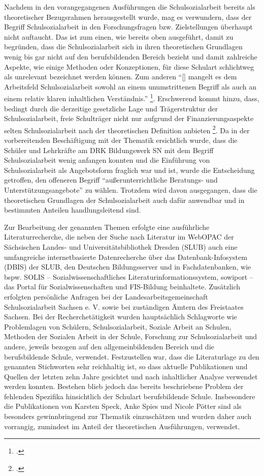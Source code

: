 Nachdem in den vorangegangenen Ausführungen die Schulsozialarbeit bereits als theoretischer Bezugsrahmen herausgestellt wurde, mag es verwundern, dass der Begriff Schulsozialarbeit in den Forschungsfragen bzw. Zielstellungen überhaupt nicht auftaucht. Das ist zum einen, wie bereits oben ausgeführt, damit zu begründen, dass die Schulsozialarbeit sich in ihren theoretischen Grundlagen wenig bis gar nicht auf den berufsbildenden Bereich bezieht und damit zahlreiche Aspekte, wie einige Methoden oder Konzeptionen, für diese Schulart schlichtweg als unrelevant bezeichnet werden können. Zum anderen "`[\punkte] mangelt es dem Arbeitsfeld Schulsozialarbeit sowohl an einem unumstrittenen Begriff als auch an einem relativ klaren inhaltlichen Verständnis."' \footcite[23]{Speck2007}. Erschwerend kommt hinzu, dass, bedingt durch die derzeitige gesetzliche Lage und Trägerstruktur der Schulsozialarbeit, freie Schulträger nicht nur aufgrund der Finanzierungsaspekte selten Schulsozialarbeit nach der theoretischen Definition anbieten \footcite[vgl.][116]{Stuewe2015}. Da in der vorbereitenden Beschäftigung mit der Thematik ersichtlich wurde, dass die Schüler und Lehrkräfte am DRK Bildungswerk SN mit dem Begriff Schulsozialarbeit wenig anfangen konnten und die Einführung von Schulsozialarbeit als Angebotsform fraglich war und ist, wurde die Entscheidung getroffen, den offeneren Begriff "`außerunterrichtliche Beratungs- und Unterstützungsangebote"' zu wählen. Trotzdem wird davon ausgegangen, dass die theoretischen Grundlagen der Schulsozialarbeit auch dafür anwendbar und in bestimmten Anteilen handlungsleitend sind.
 
Zur Bearbeitung der genannten Themen erfolgte eine ausführliche Literaturrecherche, die neben der Suche nach Literatur im WebOPAC der Sächsischen Landes- und Universitätsbibliothek Dresden (SLUB) auch eine umfangreiche internetbasierte Datenrecherche über das Datenbank-Infosystem (DBIS) der SLUB, den Deutschen Bildungsserver und in Fachdatenbanken, wie bspw. SOLIS -- Sozialwissenschaftliches Literaturinformationssystem, sowiport -- das Portal für Sozialwissenschaften und FIS-Bildung beinhaltete. Zusätzlich erfolgten persönliche Anfragen bei der Landesarbeitsgemeinschaft Schulsozialarbeit Sachsen e. V. sowie bei zuständigen Ämtern des Freistaates Sachsen. Bei der Recherchetätigkeit wurden hauptsächlich Schlagworte wie Problemlagen von Schülern, Schulsozialarbeit, Soziale Arbeit an Schulen, Methoden der Sozialen Arbeit in der Schule, Forschung zur Schulsozialarbeit und andere, jeweils bezogen auf den allgemeinbildenden Bereich und die berufsbildende Schule, verwendet. Festzustellen war, dass die Literaturlage zu den genannten Stichworten sehr reichhaltig ist, so dass aktuelle Publikationen und Quellen der letzten zehn Jahre gesichtet und nach inhaltlicher Analyse verwendet werden konnten. Bestehen blieb jedoch das bereits beschriebene Problem der fehlenden Spezifika hinsichtlich der Schulart berufsbildende Schule. Insbesondere die Publikationen von Karsten Speck, Anke Spies und Nicole Pötter sind als besonders gewinnbringend zur Thematik einzuschätzen und wurden daher auch vorrangig, zumindest im Anteil der theoretischen Ausführungen, verwendet. 


